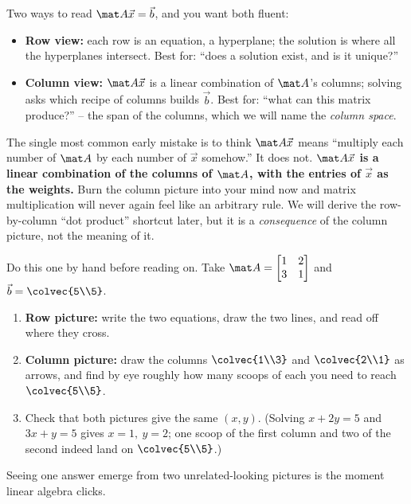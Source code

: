 \begin{focusbox}
Two ways to read $\mat A\vec x = \vec b$, and you want both fluent:
\begin{itemize}
  \item \textbf{Row view:} each row is an equation, a hyperplane; the solution is where all the
  hyperplanes intersect. Best for: ``does a solution exist, and is it unique?''
  \item \textbf{Column view:} $\mat A\vec x$ is a linear combination of $\mat A$'s columns; solving
  asks which recipe of columns builds $\vec b$. Best for: ``what can this matrix produce?'' -- the
  span of the columns, which we will name the \emph{column space}.
\end{itemize}
\end{focusbox}

\begin{trapbox}
The single most common early mistake is to think $\mat A\vec x$ means ``multiply each number of
$\mat A$ by each number of $\vec x$ somehow.'' It does not. \textbf{$\mat A\vec x$ is a linear
combination of the columns of $\mat A$, with the entries of $\vec x$ as the weights.} Burn the column
picture into your mind now and matrix multiplication will never again feel like an arbitrary rule. We
will derive the row-by-column ``dot product'' shortcut later, but it is a \emph{consequence} of the
column picture, not the meaning of it.
\end{trapbox}

\begin{labbox}
Do this one by hand before reading on. Take $\mat A=\begin{bmatrix}1&2\\3&1\end{bmatrix}$ and
$\vec b=\colvec{5\\5}$.
\begin{enumerate}
  \item \textbf{Row picture:} write the two equations, draw the two lines, and read off where they
  cross.
  \item \textbf{Column picture:} draw the columns $\colvec{1\\3}$ and $\colvec{2\\1}$ as arrows, and
  find by eye roughly how many scoops of each you need to reach $\colvec{5\\5}$.
  \item Check that both pictures give the same $(x,y)$. (Solving $x+2y=5$ and $3x+y=5$ gives
  $x=1,\ y=2$; one scoop of the first column and two of the second indeed land on $\colvec{5\\5}$.)
\end{enumerate}
Seeing one answer emerge from two unrelated-looking pictures is the moment linear algebra clicks.
\end{labbox}

